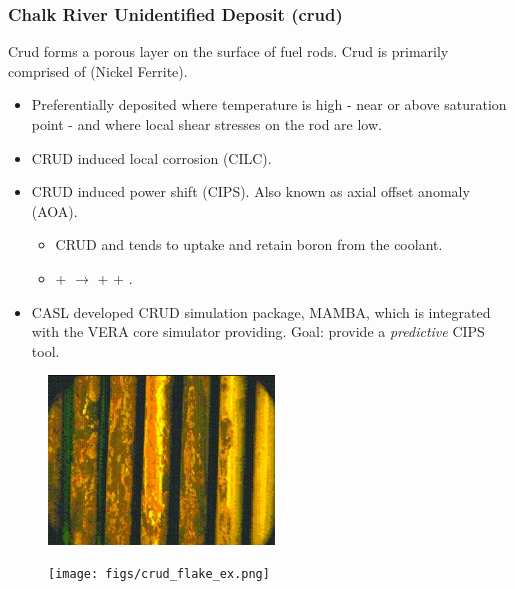 \documentclass[t, pdftex]{beamer}
\begin{document}
\begin{frame}
    \frametitle{Chalk River Unidentified Deposit (crud)}
    Crud forms a porous layer on the surface of fuel rods.  Crud is primarily comprised of  (Nickel Ferrite).
\begin{small}
    \begin{itemize}
    \item Preferentially deposited where temperature is high - near or above saturation point - and where local shear stresses on the rod are low.
	\item CRUD induced local corrosion (CILC).
    \item CRUD induced power shift (CIPS). Also known as axial offset anomaly (AOA).
    \begin{itemize} 
    	\item CRUD and tends to uptake and retain boron from the coolant.
    	\item {} +    $\rightarrow$  +  +  .
    \end{itemize}
    \item CASL developed CRUD simulation package, MAMBA, which is integrated with the VERA core simulator providing.  Goal: provide a \emph{predictive} CIPS tool.
    \end{itemize}
\end{small}
%
    \begin{figure}
        \centering
        \begin{minipage}{.7\textwidth}
            \centering
            \includegraphics[width=6cm]{figs/crud-crud.jpg}
        \end{minipage}%
        \begin{minipage}{.4\textwidth}
            \centering
            \texttt{[image: figs/crud\_flake\_ex.png]}
        \end{minipage}
    \end{figure}
\end{frame}
\end{document}
